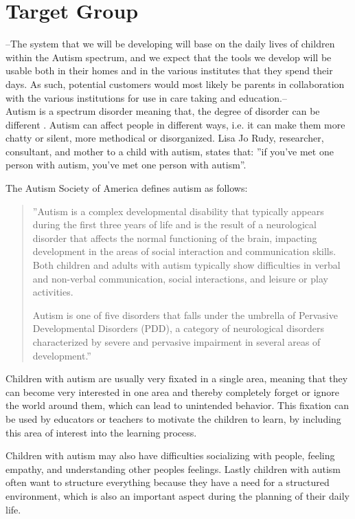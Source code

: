 \section{Target Group}
--The system that we will be developing will base on the daily lives of children within the Autism spectrum, and we expect that the tools we develop will be usable both in their homes and in the various institutes that they spend their days.
As such, potential customers would most likely be parents in collaboration with the various institutions for use in care taking and education.--\\

Autism is a spectrum disorder meaning that, the degree of disorder can be different \cite{autism.about.com1}. Autism can affect people in different ways, i.e. it can make them more chatty or silent, more methodical or disorganized. Lisa Jo Rudy, researcher, consultant, and mother to a child with autism, states \cite{autism.about.com2} that: ''if you've met one person with autism, you've met one person with autism''.

The Autism Society of America defines autism  as follows: 
\begin{quotation}
	''Autism is a complex developmental disability that typically appears during the first three years of life and is the result of a neurological disorder that affects the normal functioning of the brain, impacting development in the areas of social interaction and communication skills. Both children and adults with autism typically show difficulties in verbal and non-verbal communication, social interactions, and leisure or play activities.
	
	Autism is one of five disorders that falls under the umbrella of Pervasive Developmental Disorders (PDD), a category of neurological disorders characterized by severe and pervasive impairment in several areas of development.''\cite{definitionOfAutism}
\end{quotation}

Children with autism are usually very fixated in a single area, meaning that they can become very interested in one area and thereby completely forget or ignore the world around them, which can lead to unintended behavior. This fixation can be used by educators or teachers to motivate the children to learn, by including this area of interest into the learning process.

   Children with autism may also have difficulties socializing with people, feeling empathy, and understanding other peoples feelings. Lastly children with autism often want to structure everything because they have a need for a structured environment, which is also an important aspect during the planning of their daily life.
   
